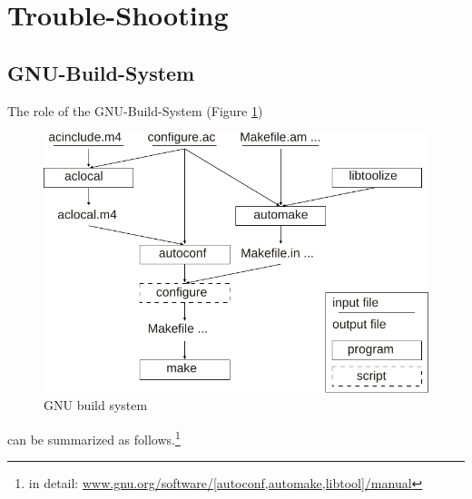 \section{Trouble-Shooting}
\subsection{GNU-Build-System}\label{sec:gnu}
The role of the GNU-Build-System (Figure \ref{fig:GNUBuild}) 
\begin{figure}[h]
	\centering
	
  	\includegraphics[width=12cm]{Figures/mbsim_gnubuildsystem.pdf}
  	\caption{GNU build system}
  	\label{fig:GNUBuild}
\end{figure}
can be summarized as follows.\footnote{in detail: \url{www.gnu.org/software/[autoconf,automake,libtool]/manual}}\par\nopagebreak
